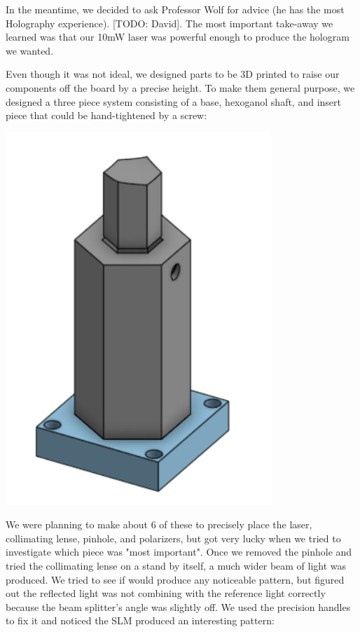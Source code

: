 \documentclass[12pt]{article}
\begin{document}
In the meantime, we decided to ask Professor Wolf for advice (he has the most Holography experience). [TODO: David]. The most important take-away we learned was that our 10mW laser was powerful enough to produce the hologram we wanted.

Even though it was not ideal, we designed parts to be 3D printed to raise our components off the board by a precise height. To make them general purpose, we designed a three piece system consisting of a base, hexoganol shaft, and insert piece that could be hand-tightened by a screw:

\begin{center}
\includegraphics[width=100mm]{holder.png}
\end{center}

We were planning to make about 6 of these to precisely place the laser, collimating lense, pinhole, and polarizers, but got very lucky when we tried to investigate which piece was "most important". Once we removed the pinhole and tried the collimating lense on a stand by itself, a much wider beam of light was produced. We tried to see if would produce any noticeable pattern, but figured out the reflected light was not combining with the reference light correctly because the beam splitter's angle was slightly off. We used the precision handles to fix it and noticed the SLM produced an interesting pattern:
\end{document}
